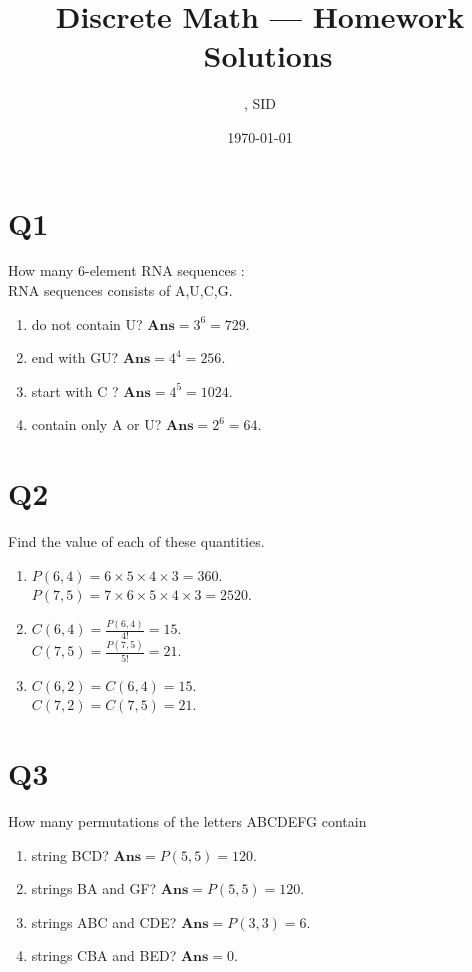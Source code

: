 \documentclass[11pt]{article}
\title{Discrete Math --- Homework \Homework \ Solutions}
\author{\Name, SID \SID}
\date{\today}
\newenvironment{qparts}{\begin{enumerate}[{(}a{)}]}{\end{enumerate}}
\newenvironment{solution}{{\\\bf Solution}:}{\smallskip}
\begin{document}
\maketitle

\section*{Q1}
How many 6-element RNA sequences
\begin{solution}\\
    RNA sequences consists of A,U,C,G.
    \begin{qparts}
        \item do not contain U?
        $\textbf{Ans}=3^{6}=729$.
        
        \item end with GU?
        $\textbf{Ans}=4^{4}=256$.

        \item start with C ?
        $\textbf{Ans}=4^{5}=1024$.

        \item contain only A or U?
        $\textbf{Ans}=2^{6}=64$.
    \end{qparts}
\end{solution}

\section*{Q2}
Find the value of each of these quantities.
\begin{qparts}
    
    \item $P(6,4)=6\times 5\times 4\times 3=360$.\\
    $P(7,5)=7\times 6\times 5\times 4\times 3=2520$.
    
    \item $C(6,4)=\frac{P(6,4)}{4!}=15$.\\
    $C(7,5)=\frac{P(7,5)}{5!}=21$.
    
    \item $C(6,2)=C(6,4)=15$.\\
    $C(7,2)=C(7,5)=21$.
\end{qparts}

\section*{Q3}
How many permutations of the letters ABCDEFG contain
\begin{qparts}
    
    \item string BCD?
    $\textbf{Ans}=P(5,5)=120$.
    \item strings BA and GF?
    $\textbf{Ans}=P(5,5)=120$.
    \item strings ABC and CDE?
    $\textbf{Ans}=P(3,3)=6$.
    \item strings CBA and BED?
    $\textbf{Ans}=0$.
\end{qparts}
\end{document}
